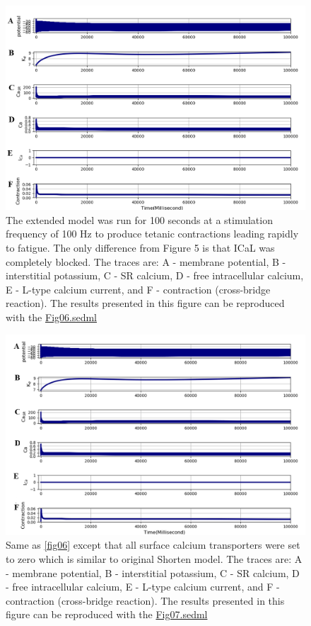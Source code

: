 \documentclass[fleqn,10pt]{physiome}
\begin{document}
\begin{figure}[h!]
\centering
\includegraphics[width=0.9\linewidth]{figure06}
\caption{The extended model was run for 100 seconds at a stimulation frequency of 100 Hz to produce tetanic contractions leading rapidly to fatigue. The only difference from Figure 5 is that ICaL was completely blocked. 
The traces are: A - membrane potential, B - interstitial potassium, C - SR calcium, D - free intracellular calcium, E - L-type calcium current, and F - contraction (cross-bridge reaction). The results presented in this figure can be reproduced with the \href{https://models.physiomeproject.org/workspace/5f4/file/26289d9227fbf4f66ca8106d8bf80ff9a51a5ac6/Fig06.sedml}{Fig06.sedml}}
\label{fig06}
\end{figure}

\begin{figure}[h!]
\centering
\includegraphics[width=0.9\linewidth]{figure06new}
\caption{Same as \autoref{fig06} except that all surface calcium transporters were set to zero which is similar to original Shorten model. The traces are: A - membrane potential, B - interstitial potassium, C - SR calcium, D - free intracellular calcium, E - L-type calcium current, and F - contraction (cross-bridge reaction). The results presented in this figure can be reproduced with the \href{https://models.physiomeproject.org/workspace/5f4/file/26289d9227fbf4f66ca8106d8bf80ff9a51a5ac6/Fig07.sedml}{Fig07.sedml}}
\label{fig06new}
\end{figure}
\end{document}
